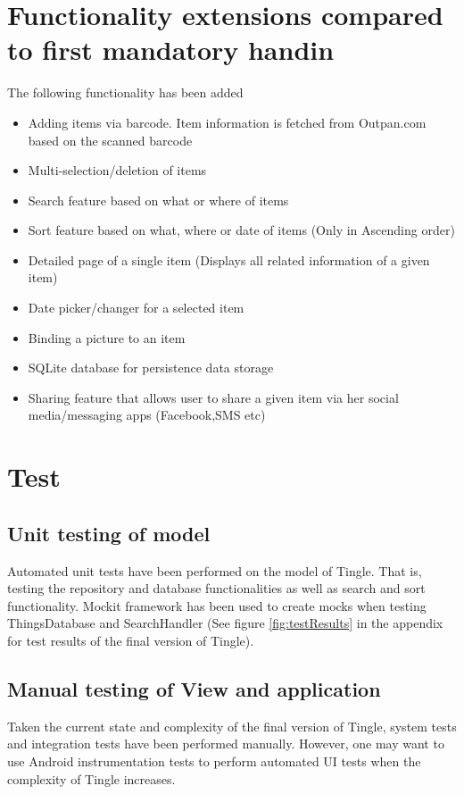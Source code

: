 \documentclass{article}
\begin{document}
\section{Functionality extensions compared to first mandatory handin}
The following functionality has been added
\begin{itemize}
	\item Adding items via barcode. Item information is fetched from Outpan.com based on the scanned barcode
	\item Multi-selection/deletion of items
	\item Search feature based on what or where of items
	\item Sort feature based on what, where or date of items (Only in Ascending order)
	\item Detailed page of a single item (Displays all related information of a given item)
	\item Date picker/changer for a selected item
	\item Binding a picture to an item
	\item SQLite database for persistence data storage
	\item Sharing feature that allows user to share a given item via her social media/messaging apps (Facebook,SMS etc)
\end{itemize}

\pagebreak
\section{Test}
\subsection{Unit testing of model}
Automated unit tests have been performed on the model of Tingle. That is, testing the repository and database functionalities as well as search and sort functionality. Mockit framework has been used to create mocks when testing ThingsDatabase and SearchHandler (See figure \ref{fig:testResults} in the appendix for test results of the final version of Tingle).

\subsection{Manual testing of View and application}
Taken the current state and complexity of the final version of Tingle, system tests and integration tests have been performed manually. However, one may want to use Android instrumentation tests to perform automated UI tests when the complexity of Tingle increases.  
\end{document}
